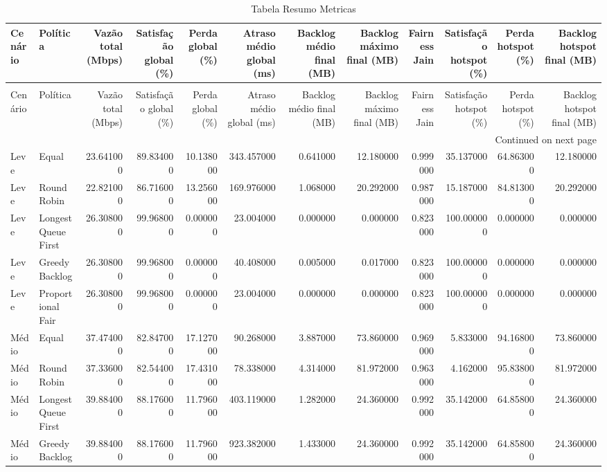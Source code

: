 \begin{longtable}{llrrrrrrrrrr}
\caption{Tabela Resumo Metricas} \label{tab:tabela_resumo_metricas} \\
\toprule
Cenário & Política & Vazão total (Mbps) & Satisfação global (\%) & Perda global (\%) & Atraso médio global (ms) & Backlog médio final (MB) & Backlog máximo final (MB) & Fairness Jain & Satisfação hotspot (\%) & Perda hotspot (\%) & Backlog hotspot final (MB) \\
\midrule
\endfirsthead
\caption[]{Tabela Resumo Metricas} \\
\toprule
Cenário & Política & Vazão total (Mbps) & Satisfação global (\%) & Perda global (\%) & Atraso médio global (ms) & Backlog médio final (MB) & Backlog máximo final (MB) & Fairness Jain & Satisfação hotspot (\%) & Perda hotspot (\%) & Backlog hotspot final (MB) \\
\midrule
\endhead
\midrule
\multicolumn{12}{r}{Continued on next page} \\
\midrule
\endfoot
\bottomrule
\endlastfoot
Leve & Equal & 23.641000 & 89.834000 & 10.138000 & 343.457000 & 0.641000 & 12.180000 & 0.999000 & 35.137000 & 64.863000 & 12.180000 \\
Leve & Round Robin & 22.821000 & 86.716000 & 13.256000 & 169.976000 & 1.068000 & 20.292000 & 0.987000 & 15.187000 & 84.813000 & 20.292000 \\
Leve & Longest Queue First & 26.308000 & 99.968000 & 0.000000 & 23.004000 & 0.000000 & 0.000000 & 0.823000 & 100.000000 & 0.000000 & 0.000000 \\
Leve & Greedy Backlog & 26.308000 & 99.968000 & 0.000000 & 40.408000 & 0.005000 & 0.017000 & 0.823000 & 100.000000 & 0.000000 & 0.000000 \\
Leve & Proportional Fair & 26.308000 & 99.968000 & 0.000000 & 23.004000 & 0.000000 & 0.000000 & 0.823000 & 100.000000 & 0.000000 & 0.000000 \\
Médio & Equal & 37.474000 & 82.847000 & 17.127000 & 90.268000 & 3.887000 & 73.860000 & 0.969000 & 5.833000 & 94.168000 & 73.860000 \\
Médio & Round Robin & 37.336000 & 82.544000 & 17.431000 & 78.338000 & 4.314000 & 81.972000 & 0.963000 & 4.162000 & 95.838000 & 81.972000 \\
Médio & Longest Queue First & 39.884000 & 88.176000 & 11.796000 & 403.119000 & 1.282000 & 24.360000 & 0.992000 & 35.142000 & 64.858000 & 24.360000 \\
Médio & Greedy Backlog & 39.884000 & 88.176000 & 11.796000 & 923.382000 & 1.433000 & 24.360000 & 0.992000 & 35.142000 & 64.858000 & 24.360000 \\

\end{longtable}
